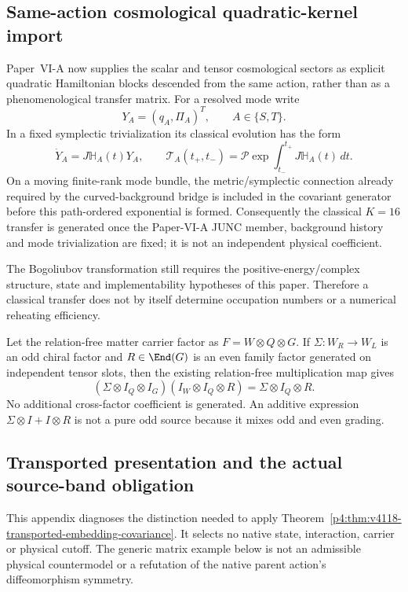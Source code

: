 \documentclass[12pt,a4paper]{article}
\begin{document}
\subsection{Same-action cosmological quadratic-kernel import}
\label{p4:sec:v189-same-action-cosmological-kernels}
Paper~VI-A now supplies the scalar and tensor cosmological sectors as explicit
quadratic Hamiltonian blocks descended from the same action, rather than as a
phenomenological transfer matrix.  For a resolved mode write
\[
 Y_A=(q_A,\Pi_A)^T,\qquad A\in\{S,T\}.
\]
In a fixed symplectic trivialization its classical evolution has the form
\[
 \dot Y_A=J\mathbb H_A(t)Y_A,
 \qquad
 \mathcal T_A(t_+,t_-)=\mathcal P\exp\!\int_{t_-}^{t_+}J\mathbb H_A(t)\,dt.
\]
On a moving finite-rank mode bundle, the metric/symplectic connection already
required by the curved-background bridge is included in the covariant
generator before this path-ordered exponential is formed.  Consequently the
classical $K=16$ transfer is generated once the Paper-VI-A JUNC member,
background history and mode trivialization are fixed; it is not an
independent physical coefficient.

The Bogoliubov transformation still requires the positive-energy/complex
structure, state and implementability hypotheses of this paper.  Therefore a
classical transfer does not by itself determine occupation numbers or a
numerical reheating efficiency.


\begin{corollary}
\label{p4:cor:v491-fermion-factor-source-multiplication}
Let the relation-free matter carrier factor as $F=W\otimes Q\otimes G$.
If $\Sigma:W_R\to W_L$ is an odd chiral factor and $R\in\End(G)$ is an even
family factor generated on independent tensor slots, then the existing
relation-free multiplication map gives
\[
 (\Sigma\otimes I_Q\otimes I_G)(I_W\otimes I_Q\otimes R)
 =\boxed{\Sigma\otimes I_Q\otimes R}.
\]
No additional cross-factor coefficient is generated.  An additive expression
$\Sigma\otimes I+I\otimes R$ is not a pure odd source because it mixes odd and
even grading.
\end{corollary}




\subsection{Transported presentation and the actual source-band obligation}
\label{p4:app:v4118-transported-embedding-diagnostics}
This appendix diagnoses the distinction needed to apply
Theorem~\ref{p4:thm:v4118-transported-embedding-covariance}. It selects
no native state, interaction, carrier or physical cutoff. The generic
matrix example below is not an admissible physical countermodel or a
refutation of the native parent action's diffeomorphism symmetry.
\end{document}
